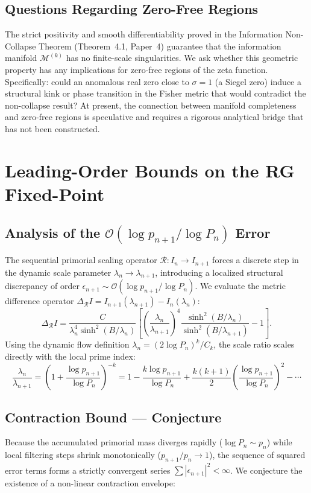 \documentclass[11pt]{article}
\theoremstyle{remark}
\begin{document}
\subsection{Questions Regarding Zero-Free Regions}
The strict positivity and smooth differentiability proved in the Information Non-Collapse Theorem (Theorem~4.1, Paper~4) guarantee that the information manifold $\mathcal{M}^{(k)}$ has no finite-scale singularities. We ask whether this geometric property has any implications for zero-free regions of the zeta function. Specifically: could an anomalous real zero close to $\sigma=1$ (a Siegel zero) induce a structural kink or phase transition in the Fisher metric that would contradict the non-collapse result? At present, the connection between manifold completeness and zero-free regions is speculative and requires a rigorous analytical bridge that has not been constructed.

\section{Leading-Order Bounds on the RG Fixed-Point}

\subsection{Analysis of the $\mathcal{O}(\log p_{n+1}/\log P_n)$ Error}
The sequential primorial scaling operator $\mathcal{R}: I_n \to I_{n+1}$ forces a discrete step in the dynamic scale parameter $\lambda_n \to \lambda_{n+1}$, introducing a localized structural discrepancy of order $\epsilon_{n+1} \sim \mathcal{O}(\log p_{n+1}/\log P_n)$. We evaluate the metric difference operator $\Delta_{\mathcal{R}} I = I_{n+1}(\lambda_{n+1}) - I_n(\lambda_n)$:
\begin{equation}
    \Delta_{\mathcal{R}} I = \frac{C}{\lambda_n^4 \sinh^2(B/\lambda_n)} \left[ \left(\frac{\lambda_n}{\lambda_{n+1}}\right)^4 \frac{\sinh^2(B/\lambda_n)}{\sinh^2(B/\lambda_{n+1})} - 1 \right].
\end{equation}
Using the dynamic flow definition $\lambda_n = (2 \log P_n)^k / C_k$, the scale ratio scales directly with the local prime index:
\begin{equation}
    \frac{\lambda_n}{\lambda_{n+1}} = \left( 1 + \frac{\log p_{n+1}}{\log P_n} \right)^{-k} = 1 - \frac{k \log p_{n+1}}{\log P_n} + \frac{k(k+1)}{2}\left(\frac{\log p_{n+1}}{\log P_n}\right)^2 - \cdots
\end{equation}

\subsection{Contraction Bound — Conjecture}
Because the accumulated primorial mass diverges rapidly ($\log P_n \sim p_n$) while local filtering steps shrink monotonically ($p_{n+1}/p_n \to 1$), the sequence of squared error terms forms a strictly convergent series $\sum |\epsilon_{n+1}|^2 < \infty$. We conjecture the existence of a non-linear contraction envelope:
\end{document}

